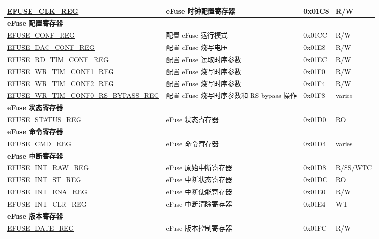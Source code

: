 \begin{longtable}{ | p{7cm} | p{7.2cm} | p{1.3cm} | p{1cm} | }
\hyperref[regdesc:EFUSECLKREG]{EFUSE\_CLK\_REG} & eFuse 时钟配置寄存器 & 0x01C8 & R/W \\ \hline
\multicolumn{4}{|l|}{\textbf{eFuse 配置寄存器}} \\ \hline
\hyperref[regdesc:EFUSECONFREG]{EFUSE\_CONF\_REG} & 配置 eFuse 运行模式 & 0x01CC & R/W \\ \hline
\hyperref[regdesc:EFUSEDACCONFREG]{EFUSE\_DAC\_CONF\_REG} & 配置 eFuse 烧写电压 & 0x01E8 & R/W \\ \hline
\hyperref[regdesc:EFUSERDTIMCONFREG]{EFUSE\_RD\_TIM\_CONF\_REG} & 配置 eFuse 读取时序参数 & 0x01EC & R/W \\ \hline
\hyperref[regdesc:EFUSEWRTIMCONF1REG]{EFUSE\_WR\_TIM\_CONF1\_REG} & 配置 eFuse 烧写时序参数 & 0x01F0 & R/W \\ \hline
\hyperref[regdesc:EFUSEWRTIMCONF2REG]{EFUSE\_WR\_TIM\_CONF2\_REG} &配置 eFuse 烧写时序参数 & 0x01F4 & R/W \\ \hline
\hyperref[regdesc:EFUSEWRTIMCONF0RSBYPASSREG]{EFUSE\_WR\_TIM\_CONF0\_RS\_BYPASS\_REG} & 配置 eFuse 烧写时序参数和 RS bypass 操作 & 0x01F8 & varies \\ \hline
\multicolumn{4}{|l|}{\textbf{eFuse 状态寄存器}} \\ \hline
\hyperref[regdesc:EFUSESTATUSREG]{EFUSE\_STATUS\_REG} & eFuse 状态寄存器 & 0x01D0 & RO \\ \hline
\multicolumn{4}{|l|}{\textbf{eFuse 命令寄存器}} \\ \hline
\hyperref[regdesc:EFUSECMDREG]{EFUSE\_CMD\_REG} & eFuse 命令寄存器 & 0x01D4 & varies \\ \hline
\multicolumn{4}{|l|}{\textbf{eFuse 中断寄存器}} \\ \hline
\hyperref[regdesc:EFUSEINTRAWREG]{EFUSE\_INT\_RAW\_REG} & eFuse 原始中断寄存器 & 0x01D8 & R/SS/WTC \\ \hline
\hyperref[regdesc:EFUSEINTSTREG]{EFUSE\_INT\_ST\_REG} & eFuse 中断状态寄存器 & 0x01DC & RO \\ \hline
\hyperref[regdesc:EFUSEINTENAREG]{EFUSE\_INT\_ENA\_REG} & eFuse 中断使能寄存器 & 0x01E0 & R/W \\ \hline
\hyperref[regdesc:EFUSEINTCLRREG]{EFUSE\_INT\_CLR\_REG} & eFuse 中断清除寄存器 & 0x01E4 & WT \\ \hline
\multicolumn{4}{|l|}{\textbf{eFuse 版本寄存器}} \\ \hline
\hyperref[regdesc:EFUSEDATEREG]{EFUSE\_DATE\_REG} & eFuse 版本控制寄存器 & 0x01FC & R/W \\ \hline
\end{longtable}
